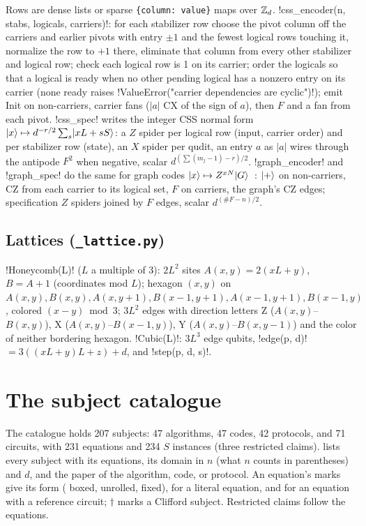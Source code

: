 Rows are dense lists or sparse \texttt{\{column: value\}} maps over $\mathbb{Z}_{d}$.
\py!css_encoder(n, stabs, logicals, carriers)!: for each stabilizer row choose the pivot column
off the carriers and earlier pivots with entry $\pm1$ and the fewest logical rows touching it,
normalize the row to $+1$ there, eliminate that column from every other stabilizer and logical
row; check each logical row is 1 on its carrier; order the logicals so that a logical is ready
when no other pending logical has a nonzero entry on its carrier (none ready raises
\py!ValueError("carrier dependencies are cyclic")!); emit Init on non-carriers, carrier fans
($|a|$ CX of the sign of $a$), then $F$ and a fan from each pivot. \py!css_spec! writes the
integer CSS normal form $\lvert x \rangle\mapsto d^{-r/2}\sum_s\lvert xL+sS \rangle$: a $Z$ spider per logical row
(input, carrier order) and per stabilizer row (state), an $X$ spider per qudit, an entry $a$ as
$|a|$ wires through the antipode $F^2$ when negative, scalar $d^{(\sum(m_j-1) - r)/2}$.
\py!graph_encoder! and \py!graph_spec! do the same for graph codes
$\lvert x \rangle\mapsto Z^{xN}\lvert G \rangle$~\cite{schlingemann2001quantum}: $\lvert + \rangle$ on non-carriers, CZ from
each carrier to its logical set, $F$ on carriers, the graph's CZ edges; specification $Z$
spiders joined by $F$ edges, scalar $d^{(\#F - n)/2}$.

\subsection{Lattices (\texttt{\_lattice.py})}

\py!Honeycomb(L)! ($L$ a multiple of 3): $2L^2$ sites $A(x,y)=2(xL+y)$, $B=A+1$ (coordinates
mod $L$); hexagon $(x,y)$ on $A(x,y), B(x,y), A(x,y{+}1), B(x{-}1,y{+}1), A(x{-}1,y{+}1),
B(x{-}1,y)$, colored $(x-y)\bmod3$; $3L^2$ edges with direction letters Z ($A(x,y)$--$B(x,y)$),
X ($A(x,y)$--$B(x{-}1,y)$), Y ($A(x,y)$--$B(x,y{-}1)$) and the color of neither bordering
hexagon. \py!Cubic(L)!: $3L^3$ edge qubits, \py!edge(p, d)! $= 3((xL+y)L+z)+d$, and
\py!step(p, d, s)!.

\section{The subject catalogue}\label{sec:bench-catalogue}

The catalogue holds 207 subjects: 47 algorithms, 47 codes, 42 protocols, and 71 circuits, with
231 equations and 234 $S$ instances (three restricted claims).  lists every subject with its equations, its domain in
$n$ (what $n$ counts in parentheses) and $d$, and the paper of the algorithm, code, or protocol.
An equation's marks give its form ( boxed,  unrolled,  fixed), 
for a literal equation, and  for an equation with a reference circuit; $\dagger$ marks a
Clifford subject. Restricted claims follow the equations.

